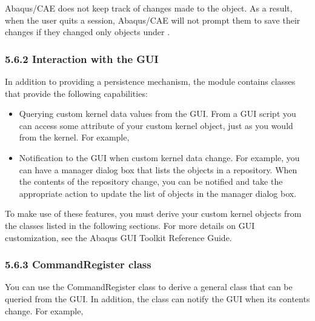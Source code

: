 \documentclass[letterpaper,10pt,english]{sphinxmanual}
\begin{document}
Abaqus/CAE does not keep track of changes made to the  object. As a result, when the user quits a session, Abaqus/CAE will not prompt them to save their changes if they changed only objects under .


\subsubsection{5.6.2 Interaction with the GUI}
\label{\detokenize{abq_script_guide:interaction-with-the-gui}}
In addition to providing a persistence mechanism, the  module contains classes that provide the following capabilities:
\begin{itemize}
\item {} 
Querying custom kernel data values from the GUI. From a GUI script you can access some attribute of your custom kernel object, just as you would from the kernel. For example,


\item {} 
Notification to the GUI when custom kernel data change. For example, you can have a manager dialog box that lists the objects in a repository. When the contents of the repository change, you can be notified and take the appropriate action to update the list of objects in the manager dialog box.

\end{itemize}

To make use of these features, you must derive your custom kernel objects from the classes listed in the following sections. For more details on GUI customization, see the Abaqus GUI Toolkit Reference Guide.


\subsubsection{5.6.3 CommandRegister class}
\label{\detokenize{abq_script_guide:commandregister-class}}
You can use the CommandRegister class to derive a general class that can be queried from the GUI. In addition, the class can notify the GUI when its contents change. For example,

\begin{sphinxVerbatim}[commandchars=\\\{\},numbers=left,firstnumber=1,stepnumber=1]
 
     
\end{sphinxVerbatim}
\end{document}

